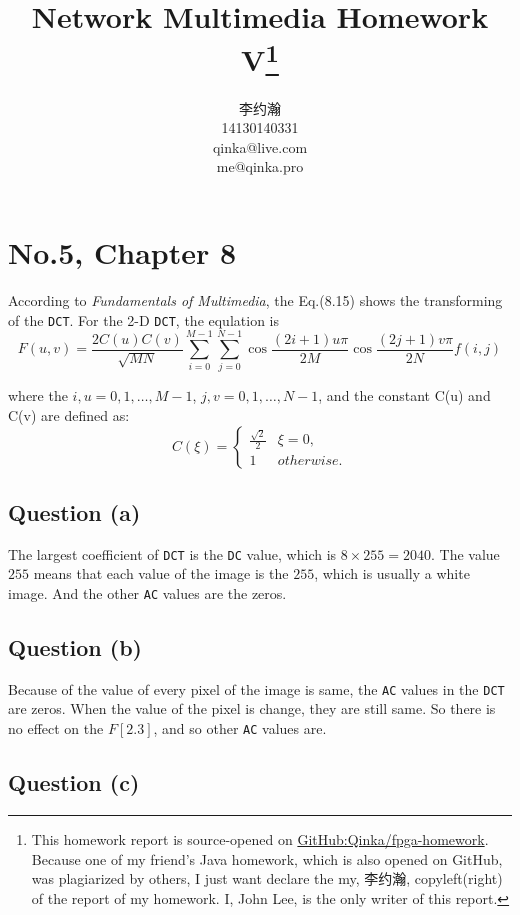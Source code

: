 \documentclass{article}
\title{Network Multimedia Homework V\thanks{%
        This homework report is source-opened on
        \href{https://github.com/Qinka/fgpa-homework}{GitHub:Qinka/fpga-homework}.
        Because one of my friend's Java homework, which is also opened on GitHub, was plagiarized by others, I just want declare the my, 李约瀚, copyleft(right) of the report of my homework.
        I, John Lee, is the only writer of this report.
    }}
\author{李约瀚 \\ 14130140331 \\ qinka@live.com \\ me@qinka.pro}
\def\vFundamentalsOfMutimedia{\textit{Fundamentals of Multimedia}}
\begin{document}
    \maketitle
    
    \section{No.5, Chapter 8}
    According to \vFundamentalsOfMutimedia, the Eq.(8.15) shows the transforming of the \verb|DCT|.
    For the 2-D \verb|DCT|, the equlation is 
    \begin{equation}
    \label{eq:dct:baseeq}
    F(u,v) = \frac{2C(u)C(v)}{\sqrt{MN}}\sum\limits_{i=0}^{M-1}\sum\limits_{j=0}^{N-1}\cos\frac{(2i+1)u\pi}{2M}\cos\frac{(2j+1)v\pi}{2N}f(i,j)
    \end{equation}
    
    where the $i,u = 0,1,\dots,M-1$, $j,v = 0,1,\dots,N-1$, and the constant C(u) and C(v) are defined as:
    \begin{equation}
    C(\xi) = \left\{
    \begin{array}{cl}
    \frac{\sqrt{2}}{2} & \xi = 0, \\
    1 & otherwise.
    \end{array}
    \right.
    \end{equation}
    
    \subsection{Question (a)}
    
    The largest coefficient of \verb|DCT| is the \verb|DC| value, which is $8 \times 255 = 2040$.
    The value $255$ means that each value of the image is the $255$, which is usually
    a white image. And the other \verb|AC| values are the zeros.
    
    \subsection{Question (b)}
    
    Because of the value of every pixel of the image is same, the \verb|AC| values in the \verb|DCT| are zeros. 
    When the value of the pixel is change, they are still same. So there is no effect on the $F[2.3]$, and so other \verb|AC| values are.
    
    \subsection{Question (c)}
    
\end{document}
